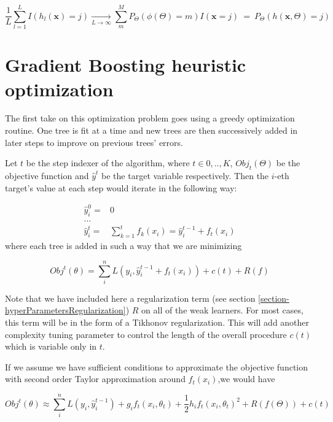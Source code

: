 \begin{equation}
\frac{1}{L} \sum_{l=1}^L I(h_l(\textbf{x}) = j) \xrightarrow[L \to \infty]{} \sum_m^M  P_{\Theta}(\phi(\Theta)= m) I(\textbf{x} =j ) \ = \ P_{\Theta}(h(\textbf{x}, \Theta) = j)
\end{equation}

\section{Gradient Boosting heuristic optimization}\label{appx:sec:boosting_optimization_heuristic}

The first take on this optimization problem goes using a greedy optimization routine.
One tree is fit at a time and new trees are then successively added in later steps to improve on previous trees' errors.

Let $t$ be the step indexer of the algorithm, where $t \in {0,..,K}$, $Obj_t(\Theta)$ be the objective function and $\hat{y}^t$ be the target variable respectively.
Then the $i$-eth target's value at each step would iterate in the following way:

\begin{equation}\label{eq:gb-targetSteps}
\begin{split}
\hat{y}_i^0 = & 0 \\
\ldots \\
\hat{y}_i^t = &\sum_{k=1}^{t} f_k(x_i) = \hat{y}^{t-1}_i + f_t(x_i)
\end{split}
\end{equation}
where each tree is added in such a way that we are minimizing

\begin{equation}
Obj^t(\theta) = \sum_i^n L(y_i, \hat{y}^{t-1}_i + f_t(x_i) ) + c(t) + R(f)
\end{equation}


Note that we have included here a regularization term (see section \cref{section-hyperParametersRegularization}) $R$ on all of the weak learners.
For most cases, this term will be in the form of a Tikhonov regularization.
This will add another complexity tuning parameter to control the length of the overall procedure $c(t)$ which is variable only in $t$.

If we assume we have sufficient conditions to approximate the objective function with second order Taylor approximation around $f_t(x_i)$,we would have

\begin{equation}\label{eq:gradientBoostingTaylor}
Obj^t(\theta) \approx \sum_i^n {L(y_i, \hat{y}^{t-1}_i) + g_i f_t(x_i,\theta_t) + \frac{1}{2} h_i {f_t(x_i,\theta_t)}^2 } + R(f(\Theta)) + c(t)
\end{equation}

